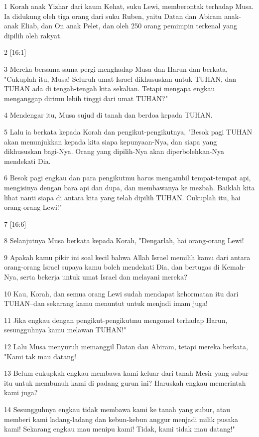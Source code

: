 \par 1 Korah anak Yizhar dari kaum Kehat, suku Lewi, memberontak terhadap Musa. Ia didukung oleh tiga orang dari suku Ruben, yaitu Datan dan Abiram anak-anak Eliab, dan On anak Pelet, dan oleh 250 orang pemimpin terkenal yang dipilih oleh rakyat.
\par 2 [16:1]
\par 3 Mereka bersama-sama pergi menghadap Musa dan Harun dan berkata, "Cukuplah itu, Musa! Seluruh umat Israel dikhususkan untuk TUHAN, dan TUHAN ada di tengah-tengah kita sekalian. Tetapi mengapa engkau menganggap dirimu lebih tinggi dari umat TUHAN?"
\par 4 Mendengar itu, Musa sujud di tanah dan berdoa kepada TUHAN.
\par 5 Lalu ia berkata kepada Korah dan pengikut-pengikutnya, "Besok pagi TUHAN akan menunjukkan kepada kita siapa kepunyaan-Nya, dan siapa yang dikhususkan bagi-Nya. Orang yang dipilih-Nya akan diperbolehkan-Nya mendekati Dia.
\par 6 Besok pagi engkau dan para pengikutmu harus mengambil tempat-tempat api, mengisinya dengan bara api dan dupa, dan membawanya ke mezbah. Baiklah kita lihat nanti siapa di antara kita yang telah dipilih TUHAN. Cukuplah itu, hai orang-orang Lewi!"
\par 7 [16:6]
\par 8 Selanjutnya Musa berkata kepada Korah, "Dengarlah, hai orang-orang Lewi!
\par 9 Apakah kamu pikir ini soal kecil bahwa Allah Israel memilih kamu dari antara orang-orang Israel supaya kamu boleh mendekati Dia, dan bertugas di Kemah-Nya, serta bekerja untuk umat Israel dan melayani mereka?
\par 10 Kau, Korah, dan semua orang Lewi sudah mendapat kehormatan itu dari TUHAN--dan sekarang kamu menuntut untuk menjadi imam juga!
\par 11 Jika engkau dengan pengikut-pengikutmu mengomel terhadap Harun, sesungguhnya kamu melawan TUHAN!"
\par 12 Lalu Musa menyuruh memanggil Datan dan Abiram, tetapi mereka berkata, "Kami tak mau datang!
\par 13 Belum cukupkah engkau membawa kami keluar dari tanah Mesir yang subur itu untuk membunuh kami di padang gurun ini? Haruskah engkau memerintah kami juga?
\par 14 Sesungguhnya engkau tidak membawa kami ke tanah yang subur, atau memberi kami ladang-ladang dan kebun-kebun anggur menjadi milik pusaka kami! Sekarang engkau mau menipu kami! Tidak, kami tidak mau datang!"

